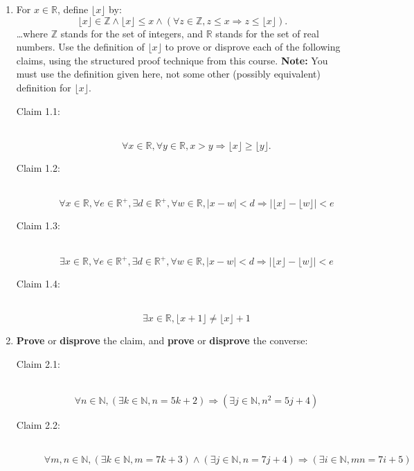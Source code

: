 \documentclass[boldsans]{article}
\newcommand{\floor}[1]{\lfloor #1\rfloor}
\begin{document}
\begin{enumerate}
\item For $x\in\mathbb{R}$, define  $\floor{x}$ by:
    \begin{equation*}
        \floor{x} \in\mathbb{Z} \wedge \floor{x}
        \leq x \wedge (\forall z \in\mathbb{Z}, z \leq x \Rightarrow z
        \leq \floor{x}).
    \end{equation*}
    \ldots where $\mathbb{Z}$ stands for the set of integers, and
    $\mathbb{R}$ stands for the set of real numbers.
    Use the definition of $\floor{x}$ to prove or disprove each of the
    following claims, using the structured proof technique from this
    course.  \textbf{Note:} You must use the definition given here,
    not some other (possibly equivalent) definition for $\floor{x}$.
  \begin{description}
  \item[Claim 1.1:] ~ 
    \begin{equation*}
      \forall x \in\mathbb{R}, \forall y \in\mathbb{R}, x > y \Rightarrow
      \floor{x} \geq \floor{y}.
    \end{equation*}
  \item[Claim 1.2:] ~
    \begin{equation*}
  \forall x\in\mathbb{R}, \forall e \in\mathbb{R}^+, \exists
  d \in\mathbb{R}^+, \forall w\in\mathbb{R}, |x-w|< d
  \Rightarrow |\floor{x}  - \floor{w}| < e
    \end{equation*}
  \item[Claim 1.3:] ~
    \begin{equation*}
        \exists x\in\mathbb{R}, \forall e \in\mathbb{R}^+, \exists
  d \in\mathbb{R}^+, \forall w\in\mathbb{R}, |x-w|< d
  \Rightarrow |\lfloor x\rfloor - \lfloor w\rfloor| < e
    \end{equation*}
  \item[Claim 1.4:] ~
    \begin{equation*}
      \exists x \in\mathbb{R}, \floor{x + 1} \neq \floor{x} + 1
    \end{equation*}
  \end{description}

\item \textbf{Prove} or \textbf{disprove} the claim, and
  \textbf{prove} or \textbf{disprove} the converse:
  \begin{description}
  \item[Claim 2.1:] ~
    \begin{equation*}
      \forall n \in\mathbb{N}, \left(\exists k\in\mathbb{N}, n =
        5k+2\right) \Rightarrow \left(\exists j\in\mathbb{N}, n^2 = 5j+4\right)
    \end{equation*}
  \item[Claim 2.2:] ~
    \begin{equation*}
      \forall m, n\in\mathbb{N}, \left(\exists k\in\mathbb{N}, m =
        7k+3\right) \wedge \left(\exists j\in\mathbb{N}, n = 7j + 4\right)
      \Rightarrow \left(\exists i\in\mathbb{N}, mn = 7i + 5\right)
    \end{equation*}
  \end{description}

\end{enumerate}
\end{document}
